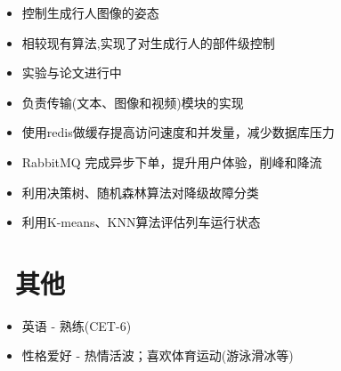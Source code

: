 \documentclass{resume}
\begin{document}
\begin{itemize}[topsep = 0 pt, partopsep = 0pt]
  \item 控制生成行人图像的姿态
  \item 相较现有算法,实现了对生成行人的部件级控制
  \item 实验与论文进行中
\end{itemize}

\begin{itemize}[topsep = 0 pt, partopsep = 0pt]
  \item 负责传输(文本、图像和视频)模块的实现
\end{itemize}

\begin{itemize}[topsep = 0 pt, partopsep = 0pt]
  \item 使用redis做缓存提高访问速度和并发量，减少数据库压力
  \item RabbitMQ 完成异步下单，提升用户体验，削峰和降流
\end{itemize}

\begin{itemize}[topsep = 0 pt, partopsep = 0pt]
  \item 利用决策树、随机森林算法对降级故障分类
  \item 利用K-means、KNN算法评估列车运行状态
\end{itemize}

\section{\faInfo\ 其他}
\begin{itemize}[parsep=0.5ex]
  \item  英语 - 熟练(CET-6)
  \item  性格爱好 - 热情活波；喜欢体育运动(游泳滑冰等)
\end{itemize}
\end{document}
